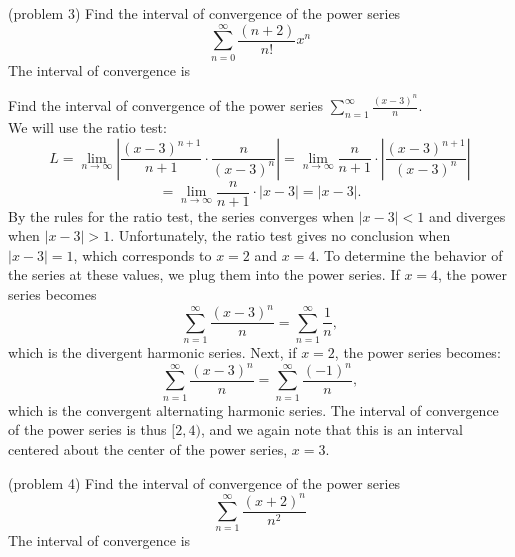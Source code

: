 \documentclass[handout]{ximera}
\begin{document}
\begin{problem}(problem 3)
Find the interval of convergence of the power series
\[
\sum_{n=0}^\infty \frac{(n+2)}{n!}x^n
\]
The interval of convergence is
\begin{multipleChoice}
\choice{$[-1, 1]$}
\choice[correct]{$(-\infty, \infty)$}
\end{multipleChoice}
\end{problem}


\begin{example}[example 4]
Find the interval of convergence of the power series $\displaystyle{\sum_{n=1}^\infty \frac{(x-3)^n}{n}}$.\\
We will use the ratio test:
\[
L = \lim_{n \to \infty} \left|\frac{(x-3)^{n+1}}{n+1} \cdot \frac{n}{(x-3)^n} \right| = \lim_{n \to \infty} \frac{n}{n+1} \cdot \left|  \frac{(x-3)^{n+1}}{(x-3)^n} \right| 
\]
\[
= \lim_{n \to \infty} \frac{n}{n+1}\cdot |x-3| = |x-3|.
\]
By the rules for the ratio test, the series converges when $|x-3| < 1$ and diverges when $|x-3| > 1$.
Unfortunately, the ratio test gives no conclusion when $|x-3| = 1$, which corresponds to $x = 2$ and $x = 4$.
To determine the behavior of the series at these values, we plug them into the power series.
If $x = 4$, the power series becomes
\[
\sum_{n=1}^\infty \frac{(x-3)^n}{n} = \sum_{n=1}^\infty \frac{1}{n},
\]
which is the divergent harmonic series.
Next, if $x = 2$, the power series becomes:
\[
\sum_{n=1}^\infty \frac{(x-3)^n}{n} = \sum_{n=1}^\infty \frac{(-1)^n}{n},
\]
which is the convergent alternating harmonic series.
The interval of convergence of the power series is thus $[2, 4)$, and we again note that this is an interval centered about the 
center of the power series, $x = 3$.
\end{example}



\begin{problem}(problem 4)
Find the interval of convergence of the power series
\[
\sum_{n=1}^\infty \frac{(x+2)^n}{n^2}
\]
The interval of convergence is
\begin{multipleChoice}
\choice{$[-3, -1)$}
\choice{$(-3, -1]$}
\choice[correct]{$[-3, -1]$}
\end{multipleChoice}
\end{problem}
\end{document}
